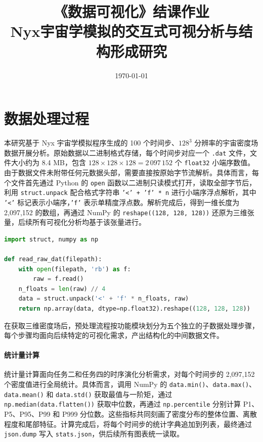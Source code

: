 \documentclass[12pt,a4paper]{article}
\title{\textbf{《数据可视化》结课作业} \\ \Large{Nyx宇宙学模拟的交互式可视分析与结构形成研究}}
\author{}
\date{\today}
\begin{document}
\maketitle
\tableofcontents
\newpage

\section{数据处理过程}

本研究基于 Nyx 宇宙学模拟程序生成的 100 个时间步、$128^3$ 分辨率的宇宙密度场数据开展分析。原始数据以二进制格式存储，每个时间步对应一个 \texttt{.dat} 文件，文件大小约为 8.4 MB，包含 $128 \times 128 \times 128 = 2\,097\,152$ 个 \texttt{float32} 小端序数值。由于数据文件未附带任何元数据头部，需要直接按原始字节流解析。具体而言，每个文件首先通过 Python 的 \texttt{open} 函数以二进制只读模式打开，读取全部字节后，利用 \texttt{struct.unpack} 配合格式字符串 \texttt{'<' + 'f' * n} 进行小端序浮点解析，其中 \texttt{'<'} 标记表示小端序，\texttt{'f'} 表示单精度浮点数。解析完成后，得到一维长度为 2,097,152 的数组，再通过 NumPy 的 \texttt{reshape((128, 128, 128))} 还原为三维张量，后续所有可视化分析均基于该张量进行。

\begin{lstlisting}[language=Python, caption=原始数据读取函数]
import struct, numpy as np

def read_raw_dat(filepath):
    with open(filepath, 'rb') as f:
        raw = f.read()
    n_floats = len(raw) // 4
    data = struct.unpack('<' + 'f' * n_floats, raw)
    return np.array(data, dtype=np.float32).reshape((128, 128, 128))
\end{lstlisting}

在获取三维密度场后，预处理流程按功能模块划分为五个独立的子数据处理步骤，每个步骤均面向后续特定的可视化需求，产出结构化的中间数据文件。

\paragraph{统计量计算}统计量计算面向任务二和任务四的时序演化分析需求，对每个时间步的 2,097,152 个密度值进行全局统计。具体而言，调用 NumPy 的 \texttt{data.min()}、\texttt{data.max()}、\texttt{data.mean()} 和 \texttt{data.std()} 获取最值与一阶矩，通过 \texttt{np.median(data.flatten())} 获取中位数，再通过 \texttt{np.percentile} 分别计算 P1、P5、P95、P99 和 P999 分位数。这些指标共同刻画了密度分布的整体位置、离散程度和尾部特征。计算完成后，将每个时间步的统计字典追加到列表，最终通过 \texttt{json.dump} 写入 \texttt{stats.json}，供后续所有图表统一读取。
\end{document}
